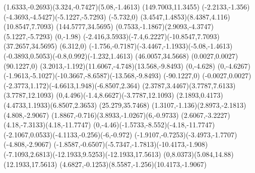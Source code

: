 {    \rcurveto(1.6333,-0.2693)(3.324,-0.7427)(5.08,-1.4613)
    \closepath
    \moveto(149.7003,11.3455)
    \rcurveto(-2.2133,-1.356)(-4.3693,-4.5427)(-5.1227,-5.7293)
    \rlineto(-5.732,0)
    \rcurveto(3.4547,1.4853)(8.4387,4.116)(10.8547,7.7093)
    \closepath
    \moveto(144.5777,34.5695)
    \rcurveto(0.7533,-1.1867)(2.9093,-4.3747)(5.1227,-5.7293)
    \rlineto(0,-1.98)
    \rcurveto(-2.416,3.5933)(-7.4,6.2227)(-10.8547,7.7093)
    \closepath
    \moveto(37.2657,34.5695)
    \rlineto(6.312,0)
    \rcurveto(-1.756,-0.7187)(-3.4467,-1.1933)(-5.08,-1.4613)
    \rcurveto(-0.3893,0.5053)(-0.8,0.992)(-1.232,1.4613)
    \moveto(46.0057,34.5668)
    \rlineto(0.0027,0.0027)
    \rlineto(90.1227,0)
    \rcurveto(3.2013,-1.192)(11.6067,-4.748)(13.568,-9.8493)
    \rlineto(0,-4.628)
    \rlineto(0,-4.6267)
    \rcurveto(-1.9613,-5.1027)(-10.3667,-8.6587)(-13.568,-9.8493)
    \rlineto(-90.1227,0)
    \rlineto(-0.0027,0.0027)
    \rcurveto(-2.3773,1.172)(-4.6613,1.948)(-6.8507,2.364)
    \rcurveto(2.3787,3.4467)(3.7787,7.6133)(3.7787,12.1093)
    \rcurveto(0,4.496)(-1.4,8.6627)(-3.7787,12.1093)
    \rcurveto(2.1893,0.4173)(4.4733,1.1933)(6.8507,2.3653)
    \moveto(25.279,35.7468)
    \rcurveto(1.3107,-1.136)(2.8973,-2.1813)(4.808,-2.9067)
    \rcurveto(1.8867,-0.716)(3.8933,-1.0267)(6,-0.9733)
    \rcurveto(2.6067,-3.2227)(4.18,-7.3133)(4.18,-11.7747)
    \rcurveto(0,-4.46)(-1.5733,-8.552)(-4.18,-11.7747)
    \rcurveto(-2.1067,0.0533)(-4.1133,-0.256)(-6,-0.972)
    \rcurveto(-1.9107,-0.7253)(-3.4973,-1.7707)(-4.808,-2.9067)
    \rcurveto(-1.8587,-0.6507)(-5.7347,-1.7813)(-10.4173,-1.908)
    \rcurveto(-7.1093,2.6813)(-12.1933,9.5253)(-12.1933,17.5613)
    \rcurveto(0,8.0373)(5.084,14.88)(12.1933,17.5613)
    \rcurveto(4.6827,-0.1253)(8.5587,-1.256)(10.4173,-1.9067)
}
